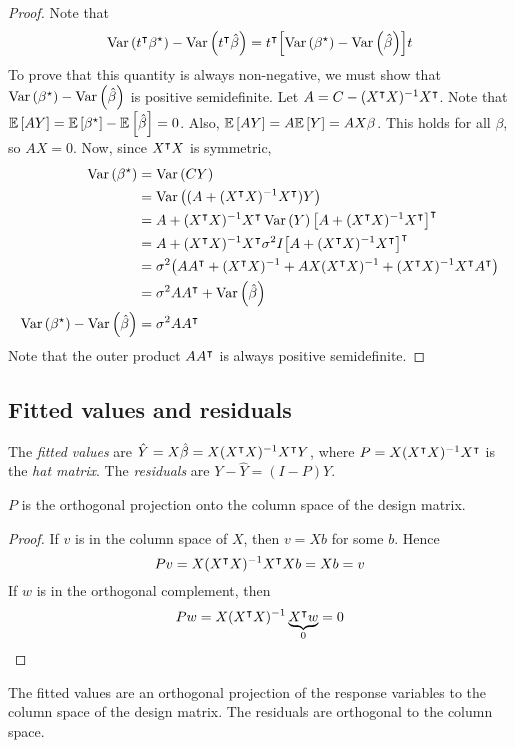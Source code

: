 \begin{proof}
	Note that
	\[ \operatorname{Var}\left({t^\intercal \beta^\star}\right) - \operatorname{Var}\left({t^\intercal \hat \beta}\right) = t^\intercal \qty[\operatorname{Var}\left({\beta^\star}\right) - \operatorname{Var}\left({\hat\beta}\right)] t \]
	To prove that this quantity is always non-negative, we must show that \( \operatorname{Var}\left({\beta^\star}\right) - \operatorname{Var}\left({\hat\beta}\right) \) is positive semidefinite.
	Let \( A = C - (X^\intercal X)^{-1} X^\intercal \).
	Note that \( \mathbb{E}\left[{AY}\right] = \mathbb{E}\left[{\beta^\star}\right] - \mathbb{E}\left[{\hat\beta}\right] = 0 \).
	Also, \( \mathbb{E}\left[{AY}\right] = A \mathbb{E}\left[{Y}\right] = AX\beta \).
	This holds for all \( \beta \), so \( AX = 0 \).
	Now, since \( X^\intercal X \) is symmetric,
	\begin{align*}
		\operatorname{Var}\left({\beta^\star}\right) &= \operatorname{Var}\left({CY}\right) \\
		&= \operatorname{Var}\left({(A+(X^\intercal X)^{-1} X^\intercal)Y}\right) \\
		&= A+(X^\intercal X)^{-1} X^\intercal \operatorname{Var}\left({Y}\right) \qty[A+(X^\intercal X)^{-1} X^\intercal]^\intercal \\
		&= A+(X^\intercal X)^{-1} X^\intercal \sigma^2 I \qty[A+(X^\intercal X)^{-1} X^\intercal]^\intercal \\
		&= \sigma^2 \qty(A A^\intercal + (X^\intercal X)^{-1} + AX(X^\intercal X)^{-1} + (X^\intercal X)^{-1} X^\intercal A^\intercal) \\
		&= \sigma^2 AA^\intercal + \operatorname{Var}\left({\hat \beta}\right) \\
		\operatorname{Var}\left({\beta^\star}\right) - \operatorname{Var}\left({\hat\beta}\right) &= \sigma^2 AA^\intercal
	\end{align*}
	Note that the outer product \( A A^\intercal \) is always positive semidefinite.
\end{proof}

\subsection{Fitted values and residuals}
\begin{definition}
	The \textit{fitted values} are \( \hat Y = X \hat \beta = X(X^\intercal X)^{-1} X^\intercal Y \), where \( P = X (X^\intercal X)^{-1} X^\intercal \) is the \textit{hat matrix}.
	The \textit{residuals} are \( Y - \hat Y = (I-P)Y \).
\end{definition}
\begin{proposition}
	\( P \) is the orthogonal projection onto the column space of the design matrix.
\end{proposition}
\begin{proof}
	If \( v \) is in the column space of \( X \), then \( v = Xb \) for some \( b \).
	Hence
	\[ Pv = X(X^\intercal X)^{-1} X^\intercal X b = Xb = v \]
	If \( w \) is in the orthogonal complement, then
	\[ Pw = X(X^\intercal X)^{-1} \underbrace{X^\intercal w}_{0} = 0 \]
\end{proof}
\begin{corollary}
	The fitted values are an orthogonal projection of the response variables to the column space of the design matrix.
	The residuals are orthogonal to the column space.
\end{corollary}

